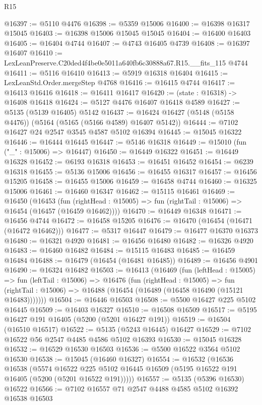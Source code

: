 \begin{lexlean}{R15}
\begin{coremodule}
{{{{{{{{{{{@16397 := @5110 @4476
@16398 := @5359 @15006
@16400 := @16398 @16317 @15045
@16403 := @16398 @15006 @15045 @15045
@16404 := @16400 @16403
@16405 := @16404 @4744
@16407 := @4743 @16405 @4739
@16408 := @16397 @16407
@16410 := LexLeanPreserve.C20ded4f4be0e5011a640fb6c30888a67.R15.__fits_115 @4744
@16411 := @5116 @16410
@16413 := @5919 @16318 @16404
@16415 := LexLeanStd.Order.mergeStep @4768
@16416 := @16415 @4744
@16417 := @16413 @16416
@16418 := @16411 @16417
@16420 := (state : @16318) -> @16408 @16418
@16424 := @5127 @4476 @16407 @16418 @4589
@16427 := @5135 (@5139 @16405) @5142
@16437 := @16424 @16427 (@5148 (@5158 @4476)) (@5164 (@5165 (@5166 @4589) @16407 @5142))
@16444 := @7102 @16427 @24 @2547 @3545 @4587 @5102 @16394
@16445 := @15045 @16322
@16446 := @16444 @16445
@16447 := @5146 @16318
@16449 := @15010 (fun ("_" : @15006) => @16447)
@16450 := @16449 @16322
@16451 := @16449 @16328
@16452 := @6193 @16318
@16453 := @16451 @16452
@16454 := @6239 @16318
@16455 := @5136 @15006
@16456 := @16455 @16317
@16457 := @16456 @15205
@16458 := @16455 @15006
@16459 := @16458 @4744
@16460 := @16325 @15006
@16461 := @16460 @16347
@16462 := @15115 @16461
@16469 := @16450
    (@16453
      (fun (rightHead : @15005) => fun (rightTail : @15006) => @16454 (@16457 (@16459 @16462))))
@16470 := @16449 @16348
@16471 := @16456 @4744
@16472 := @16458 @15205
@16476 := @16470 (@16454 (@16471 (@16472 @16462)))
@16477 := @5317 @16447
@16479 := @16477 @16370 @16373
@16480 := @16321 @4920
@16481 := @16456 @16480
@16482 := @16326 @4920
@16483 := @16460 @16482
@16484 := @15115 @16483
@16485 := @16459 @16484
@16488 := @16479 (@16454 (@16481 @16485))
@16489 := @16456 @4901
@16490 := @16324 @16482
@16503 := @16413
    (@16469
      (fun (leftHead : @15005) =>
      fun (leftTail : @15006) =>
      @16476
        (fun (rightHead : @15005) =>
        fun (rightTail : @15006) => @16488 (@16454 (@16489 (@16458 @16490 (@15121 @16483)))))))
@16504 := @16446 @16503
@16508 := @5500 @16427 @225 @5102 @16445
@16509 := @16403 @16327
@16510 := @16508 @16509
@16517 := @5195 @16427 @191 @16405 (@5200 (@5201 @16427 @191))
@16519 := @16504 (@16510 @16517)
@16522 := @5135 (@5243 @16445) @16427
@16529 := @7102 @16522 @56 @2547 @4485 @4586 @5102 @16393
@16530 := @15045 @16328
@16532 := @16529 @16530 @16503
@16536 := @5500 @16522 @3564 @5102 @16530
@16538 := @15045 (@16460 @16327)
@16554 := @16532
    (@16536
      @16538
      (@5574
        @16522
        @225
        @5102
        @16445
        @16509
        (@5195 @16522 @191 @16405 (@5200 (@5201 @16522 @191)))))
@16557 := @5135 (@5396 @16530) @16522
@16566 := @7102 @16557 @71 @2547 @4488 @4585 @5102 @16392 @16538 @16503
}}}}}}}}}}}
\end{coremodule}
\end{lexlean}
